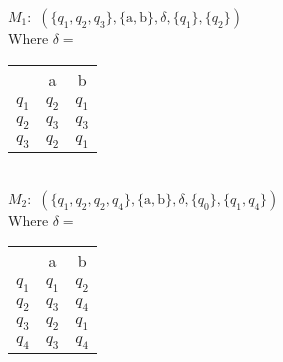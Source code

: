 $M_1:$ $(\{q_1, q_2, q_3\}, \{\text{a},\text{b}\}, \delta, \{q_1\}, \{q_2\})$ \\ 
	\indent Where $\delta=$ \begin{tabular}{|ccc|}
				&	a		&	b		\\
		$q_1$	&	$q_2$	&	$q_1$	\\
		$q_2$	&	$q_3$	&	$q_3$	\\
		$q_3$	&	$q_2$	&	$q_1$	\\
	\end{tabular} \\
$M_2:$ $(\{q_1, q_2, q_2, q_4\}, \{\text{a}, \text{b}\}, \delta, \{q_0\}, \{q_1, q_4\})$ \\ 
	\indent Where $\delta=$ \begin{tabular}{|ccc|}
				&	a		&	b		\\
		$q_1$	&	$q_1$	&	$q_2$	\\
		$q_2$	&	$q_3$	&	$q_4$	\\
		$q_3$	&	$q_2$	&	$q_1$	\\
		$q_4$	&	$q_3$	&	$q_4$	\\
	\end{tabular} \\